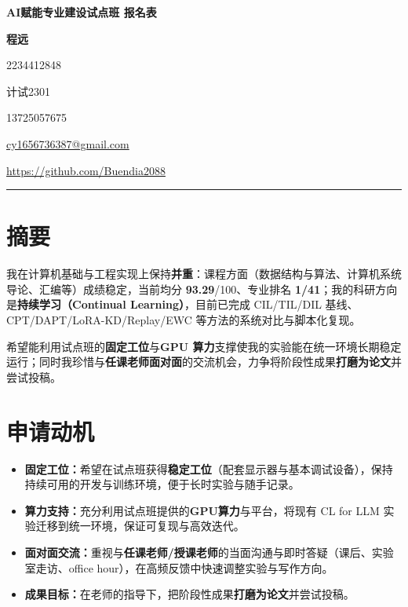 \documentclass[11pt]{ctexart}
\newcommand{\SimpleTOC}{{\small\tableofcontents}}
\begin{document}
\SimpleTOC
\medskip
\newpage



\begin{center}
  {\bfseries AI赋能专业建设试点班 报名表}\par\vspace{4pt}
  {\large \bfseries 程远}
  
  2234412848
  
  计试2301
  
  13725057675

  \href{mailto:cy1656736387@gmail.com}{cy1656736387@gmail.com}\par
  
  \href{https://github.com/Buendia2088}{https://github.com/Buendia2088}
\end{center}
\vspace{2mm}\hrule\vspace{2mm}


\section{摘要}
\vspace{-2pt}
\noindent 我在计算机基础与工程实现上保持\textbf{并重}：课程方面（数据结构与算法、计算机系统导论、汇编等）成绩稳定，当前均分 \textbf{93.29}/100、专业排名 \textbf{1/41}；我的科研方向是\textbf{持续学习（Continual Learning）}，目前已完成 CIL/TIL/DIL 基线、CPT/DAPT/LoRA-KD/Replay/EWC 等方法的系统对比与脚本化复现。\par
\noindent 希望能利用试点班的\textbf{固定工位}与\textbf{GPU 算力}支撑使我的实验能在统一环境长期稳定运行；同时我珍惜与\textbf{任课老师面对面}的交流机会，力争将阶段性成果\textbf{打磨为论文}并尝试投稿。

\section{申请动机}
\begin{itemize}[leftmargin=*,itemsep=2pt,topsep=2pt]
  \item \textbf{固定工位：}希望在试点班获得\textbf{稳定工位}（配套显示器与基本调试设备），保持持续可用的开发与训练环境，便于长时实验与随手记录。
  \item \textbf{算力支持：}充分利用试点班提供的\textbf{GPU算力}与平台，将现有 CL for LLM 实验迁移到统一环境，保证可复现与高效迭代。
  \item \textbf{面对面交流：}重视与\textbf{任课老师/授课老师}的当面沟通与即时答疑（课后、实验室走访、office hour），在高频反馈中快速调整实验与写作方向。
  \item \textbf{成果目标：}在老师的指导下，把阶段性成果\textbf{打磨为论文}并尝试投稿。
\end{itemize}
\end{document}
